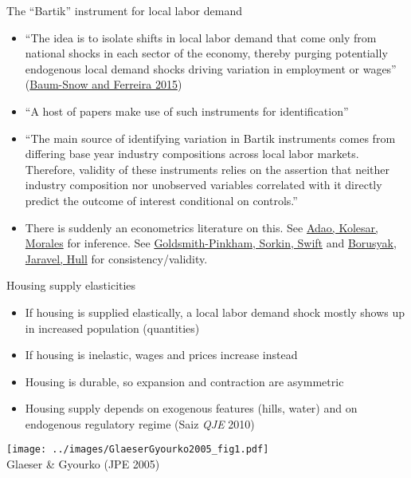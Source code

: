 \documentclass[10pt,notes=hide]{beamer}
\begin{document}
\begin{frame}{The ``Bartik'' instrument for local labor demand}
\begin{itemize}
	\item {\small ``The idea is to isolate shifts in local labor demand that come only from national shocks in each sector of the economy, thereby purging potentially endogenous local demand shocks driving variation in employment or wages'' (\href{https://ideas.repec.org/h/eee/regchp/5-3.html}{Baum-Snow and Ferreira 2015})}
	\item ``A host of papers make use of such instruments for identification''
	\item {\small ``The main source of identifying variation in Bartik instruments comes from differing base year industry compositions across local labor markets. Therefore, validity of these instruments relies on the assertion that neither industry composition nor unobserved variables correlated with it directly predict the outcome of interest conditional on controls.''}
	\item There is suddenly an econometrics literature on this. 
	See \href{https://sites.google.com/site/rradao/research}{Adao, Kolesar, Morales} for inference.
	See \href{https://paulgp.github.io/papers.html}{Goldsmith-Pinkham, Sorkin, Swift} and \href{http://about.peterhull.net/wp}{Borusyak, Jaravel, Hull} for consistency/validity.
\end{itemize}
\end{frame}
\begin{frame}{Housing supply elasticities}
\begin{itemize}
	\item If housing is supplied elastically, a local labor demand shock mostly shows up in increased population (quantities)
	\item If housing is inelastic, wages and prices increase instead
	\item Housing is durable, so expansion and contraction are asymmetric
	\item Housing supply depends on exogenous features (hills, water) and on endogenous regulatory regime (Saiz \textit{QJE} 2010)
\end{itemize}
\begin{center}
\texttt{[image: ../images/GlaeserGyourko2005\_fig1.pdf]}\\
Glaeser \& Gyourko (JPE 2005)
\end{center}
\end{frame}
\end{document}
